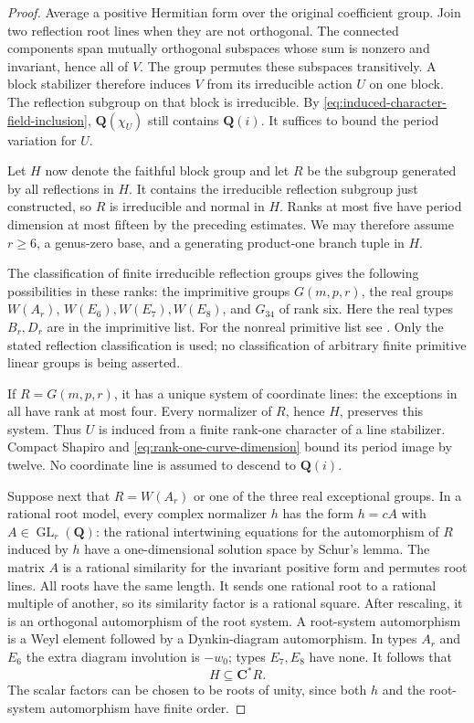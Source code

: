 \documentclass[11pt]{article}
\theoremstyle{definition}
\theoremstyle{remark}
\newcommand{\Q}{\mathbf Q}
\newcommand{\C}{\mathbf C}
\begin{document}
\begin{proof}
Average a positive Hermitian form over the original coefficient
group.  Join two reflection root lines when they are not
orthogonal.  The connected components span mutually orthogonal
subspaces whose sum is nonzero and invariant, hence all of $V$.
The group permutes these subspaces transitively.  A block
stabilizer therefore induces $V$ from its irreducible action $U$
on one block.  The reflection subgroup on that block is
irreducible.  By \eqref{eq:induced-character-field-inclusion},
$\Q(\chi_U)$ still contains $\Q(i)$.
It suffices to bound the period variation for $U$.

Let $H$ now denote the faithful block group and let $R$ be the
subgroup generated by all reflections in $H$.  It contains the
irreducible reflection subgroup just constructed, so $R$ is
irreducible and normal in $H$.  Ranks at most five have period
dimension at most fifteen by the preceding estimates.  We may
therefore assume $r\geq6$, a genus-zero base, and a generating
product-one branch tuple in $H$.

The classification of finite irreducible reflection groups gives
the following possibilities in these ranks: the imprimitive
groups $G(m,p,r)$, the real groups $W(A_r)$,
$W(E_6),W(E_7),W(E_8)$, and $G_{34}$ of rank six.
Here the real types $B_r,D_r$ are in the imprimitive list.
For the nonreal primitive list see
\cite[(4.16), p.~412; (5.12), p.~435]{CohenReflection}.
Only the stated reflection classification is used; no
classification of arbitrary finite primitive linear groups is
being asserted.

If $R=G(m,p,r)$, it has a unique system of coordinate lines:
the exceptions in \cite[Lemma~(2.7), pp.~389--390]{CohenReflection}
all have rank at most four.  Every normalizer of $R$, hence $H$,
preserves this system.  Thus $U$ is induced from a finite
rank-one character of a line stabilizer.  Compact Shapiro and
\eqref{eq:rank-one-curve-dimension} bound its period image by
twelve.  No coordinate line is assumed to descend to $\Q(i)$.

Suppose next that $R=W(A_r)$ or one of the three real exceptional
groups.  In a rational root model, every complex normalizer
$h$ has the form $h=cA$ with $A\in\operatorname{GL}_r(\Q)$:
the rational intertwining equations for the automorphism of $R$
induced by $h$ have a one-dimensional solution space by Schur's
lemma.  The matrix $A$ is a rational similarity for the invariant
positive form and permutes root lines.  All roots have the same
length.  It sends one rational root to a rational multiple of
another, so its similarity factor is a rational square.
After rescaling, it is an orthogonal automorphism of the root
system.  A root-system automorphism is a Weyl element followed
by a Dynkin-diagram automorphism.  In types $A_r$ and $E_6$ the
extra diagram involution is $-w_0$; types $E_7,E_8$ have none.
It follows that
\[
 H\subseteq\C^*R.
\]
The scalar factors can be chosen to be roots of unity, since
both $h$ and the root-system automorphism have finite order.


\end{proof}
\end{document}
